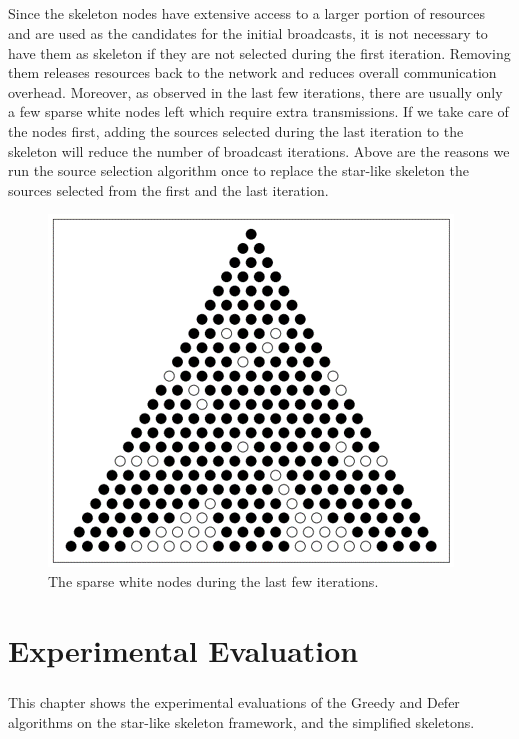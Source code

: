 \documentclass[a4paper,12pt]{report}
\begin{document}
\paragraph{}
Since the skeleton nodes have extensive access to a larger portion of resources and are used as the candidates for the initial broadcasts, it is not necessary to have them as skeleton if they are not selected during the first iteration. Removing them releases resources back to the network and reduces overall communication overhead. Moreover, as observed in the last few iterations, there are usually only a few sparse white nodes left which require extra transmissions. If we take care of the nodes first, adding the sources selected during the last iteration to the skeleton will reduce the number of broadcast iterations. Above are the reasons we run the source selection algorithm once to replace the star-like skeleton the sources selected from the first and the last iteration.

\begin{figure}[tbph]
\begin{center}
\includegraphics[width=.55\linewidth]{images/sparse.png}
\caption{The sparse white nodes during the last few iterations.}
\end{center}
\end{figure}







\chapter{Experimental Evaluation}

\paragraph{}
This chapter shows the experimental evaluations of the Greedy and Defer algorithms on the star-like skeleton framework, and the simplified skeletons. 
\end{document}
